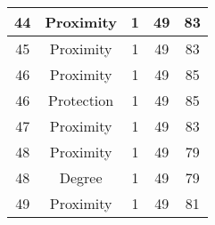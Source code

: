 \documentclass[results.tex]{subfiles}
\begin{document}
\begin{center}
\begin{tabular}{| c || c | c | c | c |}
            \hline
            44                      & Proximity                    & 1                      & 49                      & 83                   \\
            \hline
            45                      & Proximity                    & 1                      & 49                      & 83                   \\
            \hline
            46                      & Proximity                    & 1                      & 49                      & 85                   \\
            \hline
            46                      & Protection                   & 1                      & 49                      & 85                   \\
            \hline
            47                      & Proximity                    & 1                      & 49                      & 83                   \\
            \hline
            48                      & Proximity                    & 1                      & 49                      & 79                   \\
            \hline
            48                      & Degree                       & 1                      & 49                      & 79                   \\
            \hline
            49                      & Proximity                    & 1                      & 49                      & 81                   \\
            \hline
        \end{tabular}
    \end{center}
\end{document}
